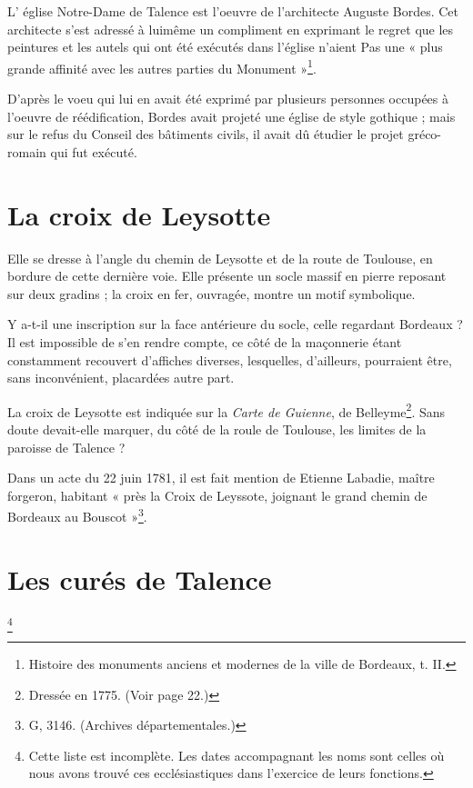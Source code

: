 L' église Notre-Dame de Talence est l'oeuvre de l'architecte Auguste Bordes. Cet architecte s'est adressé à luimême un compliment en exprimant le regret que les peintures et les autels qui ont été exécutés dans l'église n'aient Pas une « plus grande affinité avec les autres parties du Monument »\footnote{Histoire  des monuments anciens et modernes de la ville de Bordeaux, t. II.}.

D'après le voeu qui lui en avait été exprimé par plusieurs personnes occupées à l'oeuvre de réédification, Bordes avait projeté une église de style gothique ; mais sur le refus du Conseil des bâtiments civils, il avait dû étudier le projet gréco-romain qui fut exécuté.

\section{La croix de Leysotte}

Elle se dresse à l'angle du chemin de Leysotte et de la route de Toulouse, en bordure de cette dernière voie. Elle présente un socle massif en pierre reposant sur deux gradins ; la croix en fer, ouvragée, montre un motif symbolique.

Y a-t-il une inscription sur la face antérieure du socle, celle regardant Bordeaux ? Il est impossible de s'en rendre compte, ce côté de la maçonnerie étant constamment recouvert d'affiches diverses, lesquelles, d'ailleurs, pourraient être, sans inconvénient, placardées autre part.

La croix de Leysotte est indiquée sur la \textit{Carte de Guienne}, de Belleyme\footnote{Dressée en 1775. (Voir page 22.)}. Sans doute devait-elle marquer, du côté de la roule de Toulouse, les limites de la paroisse de Talence ?

Dans un acte du 22 juin 1781, il est fait mention de Etienne Labadie, maître forgeron, habitant « près la Croix de Leyssote, joignant le grand chemin de Bordeaux au Bouscot »\footnote{G, 3146. (Archives départementales.)}.


\section{Les curés de Talence}\footnote{Cette liste est incomplète. Les dates accompagnant les noms sont celles où nous avons trouvé ces ecclésiastiques dans l'exercice de leurs fonctions.}

